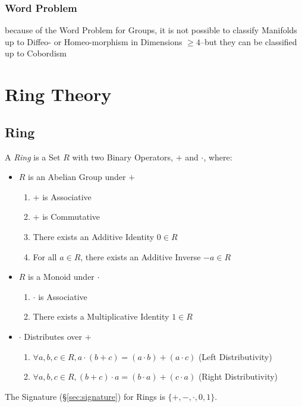 \subsubsection{Word Problem}\label{sec:word_problem}

because of the Word Problem for Groups, it is not possible to classify
Manifolds up to Diffeo- or Homeo-morphism in Dimensions $\geq 4$--but they can
be classified up to Cobordism




\section{Ring Theory}\label{sec:ring_theory}

\subsection{Ring}\label{sec:ring}

A \emph{Ring} is a Set $R$ with two Binary Operators, $+$ and $\cdot$, where:
\begin{itemize}
\item $R$ is an Abelian Group under $+$
    \begin{enumerate}
        \item $+$ is Associative
        \item $+$ is Commutative
        \item There exists an Additive Identity $0 \in R$
        \item For all $a \in R$, there exists an Additive Inverse $-a
          \in R$
    \end{enumerate}
\item $R$ is a Monoid under $\cdot$
    \begin{enumerate}
        \item $\cdot$ is Associative
        \item There exists a Multiplicative Identity $1 \in R$
    \end{enumerate}
\item $\cdot$ Distributes over $+$
    \begin{enumerate}
        \item $\forall a,b,c \in R,
            a \cdot (b + c) = (a \cdot b) + (a \cdot c)$
            (Left Distributivity)
        \item $\forall a,b,c \in R,
            (b + c) \cdot a = (b \cdot a) + (c \cdot a)$
            (Right Distributivity)
    \end{enumerate}
\end{itemize}
The Signature (\S\ref{sec:signature}) for Rings is $\{+, -, \cdot, 0, 1\}$.

